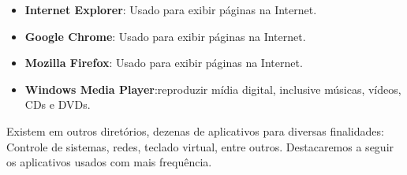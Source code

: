 \documentclass[12pt]{article}
\begin{document}
			\begin{itemize}
				\item{
					{\bf Internet Explorer}: Usado para exibir páginas na Internet.
			}
			
			
			
			\item{
				{\bf Google Chrome}: Usado para exibir páginas na Internet.
				}
				
				\item{
					{\bf Mozilla Firefox}: Usado para exibir páginas na Internet.
					}
					
				
				\item{
					{\bf Windows Media Player}:reproduzir mídia digital, inclusive músicas, vídeos, CDs e DVDs.
					}
			
			\end{itemize}
				
			Existem em outros diretórios, dezenas de aplicativos para diversas finalidades: Controle de sistemas, redes, teclado virtual, entre outros. Destacaremos a seguir os aplicativos usados com mais frequência.
			
\end{document}
